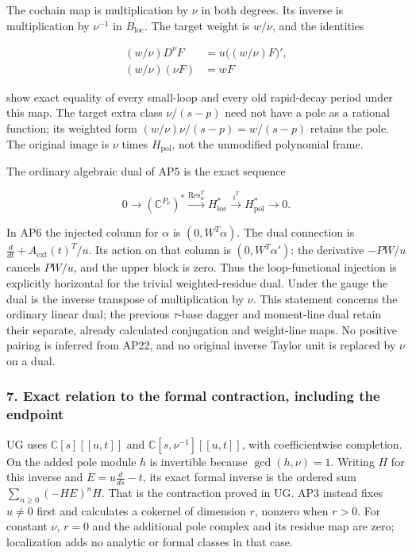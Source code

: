 The cochain map is multiplication by \(\nu\) in both degrees. Its inverse is multiplication by \(\nu^{-1}\) in \(B_{\mathrm{loc}}\). The target weight is \(w/\nu\), and the identities

\[
\begin{aligned}
(w/\nu)D^\nu F&=u\bigl((w/\nu)F\bigr)',\\
(w/\nu)(\nu F)&=wF
\end{aligned}
\tag{AP21}
\]

show exact equality of every small-loop and every old rapid-decay period under this map. The target extra class \(\nu/(s-p)\) need not have a pole as a rational function; its weighted form \((w/\nu)\nu/(s-p)=w/(s-p)\) retains the pole. The original image is \(\nu\) times \(H_{\mathrm{pol}}\), not the unmodified polynomial frame.

The ordinary algebraic dual of AP5 is the exact sequence

\[
0\longrightarrow(\mathbb C^{P_\nu})^*
\xrightarrow{\operatorname{Res}_w^T}H_{\mathrm{loc}}^*
\xrightarrow{i^T}H_{\mathrm{pol}}^*\longrightarrow0.
\tag{AP22}
\]

In AP6 the injected column for \(\alpha\) is \((0,W^T\alpha)\). The dual connection is \(\frac{d}{dt}+A_{\mathrm{ext}}(t)^T/u\). Its action on that column is \((0,W^T\alpha')\): the derivative \(-P W/u\) cancels \(P W/u\), and the upper block is zero. Thus the loop-functional injection is explicitly horizontal for the trivial weighted-residue dual. Under the gauge the dual is the inverse transpose of multiplication by \(\nu\). This statement concerns the ordinary linear dual; the previous \(\tau\)-base dagger and moment-line dual retain their separate, already calculated conjugation and weight-line maps. No positive pairing is inferred from AP22, and no original inverse Taylor unit is replaced by \(\nu\) on a dual.

\subsubsection{7. Exact relation to the formal contraction, including the endpoint}\label{endpoint-analytic_pole--exact-relation-to-the-formal-contraction-including-the-endpoint}

UG uses \(\mathbb C[s][[u,t]]\) and \(\mathbb C[s,\nu^{-1}][[u,t]]\), with coefficientwise completion. On the added pole module \(h\) is invertible because \(\gcd(h,\nu)=1\). Writing \(H\) for this inverse and \(E=u\frac{d}{ds}-t\), its exact formal inverse is the ordered sum \(\sum_{n\ge0}(-HE)^n H\). That is the contraction proved in UG. AP3 instead fixes \(u\ne0\) first and calculates a cokernel of dimension \(r\), nonzero when \(r>0\). For constant \(\nu\), \(r=0\) and the additional pole complex and its residue map are zero; localization adds no analytic or formal classes in that case.

